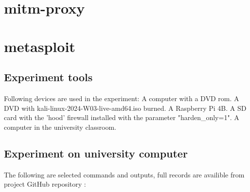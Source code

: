 \documentclass[mscthesis]{usiinfthesis}
\begin{document}
\section{mitm-proxy}

\section{metasploit}
\subsection{Experiment tools}
\paragraph{}
Following devices are used in the experiment: A computer with a DVD rom. A DVD with kali-linux-2024-W03-live-amd64.iso burned. A Raspberry Pi 4B. A SD card with the 'hood' firewall installed with the parameter "harden\_only=1". A computer in the university classroom.

\subsection{Experiment on university computer}
\paragraph{}
The following are selected commands and outputs, full records are availible from project GitHub repository \citep{hood:github}:
\end{document}
